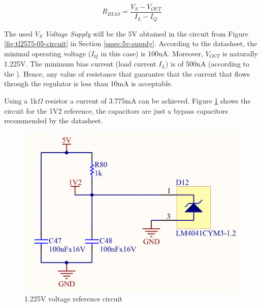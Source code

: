 			\begin{equation}\label{eqn:rbis-adr510}
				R_{BIAS} = \frac{V_{S} - V_{OUT}}{I_{L} - I_{Q}}
			\end{equation}

			The used $V_{S}$ \textit{Voltage Supply} will be the 5V obtained in the circuit from Figure \ref{fig:tl2575-05-circuit} in Section \ref{sssec:5v-supply}. According to the datasheet, the minimul operating voltage ($I_{Q}$ in this case) is 100uA. Moreover, $V_{OUT}$ is naturally 1.225V. The minimum bias current (load current $I_{L}$) is of 500nA (according to the \cite{lm2907-datasheet}). Hence, any value of resistance that guarantee that the current that flows through the regulator is less than 10mA is acceptable.
			\par
			Using a 1k$\Omega$ resistor a current of 3.775mA can be achieved. Figure \ref{fig:1v2-circuit} shows the circuit for the 1V2 reference, the capacitors are just a bypass capacitors recommended by the datasheet.

			\begin{figure}[htbp]
				\centering
				\includegraphics[width=.6\textwidth]{figuras/fig-1v2-circuit}
				\caption{1.225V  voltage reference circuit}
				\label{fig:1v2-circuit}
			\end{figure}	 
